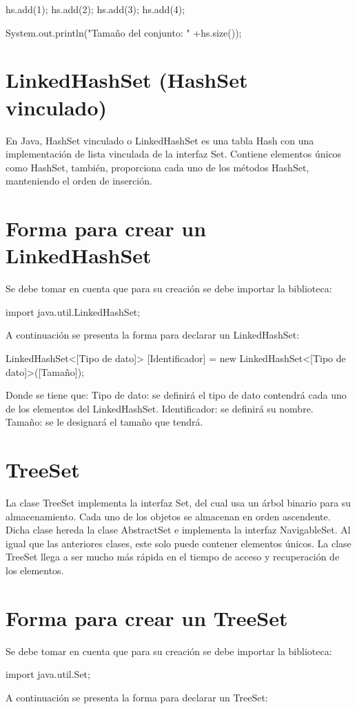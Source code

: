 \documentclass[12pt, letterpaper]{article} %
\begin{document}
hs.add(1);
hs.add(2);
hs.add(3);
hs.add(4);

System.out.println("Tamaño del conjunto: " +hs.size());


\section*{LinkedHashSet (HashSet vinculado)}
En Java, HashSet vinculado o LinkedHashSet es una tabla Hash con una implementación de lista vinculada de la interfaz Set. Contiene elementos únicos como HashSet, también, proporciona cada uno de los métodos HashSet, manteniendo el orden de inserción.

\section*{Forma para crear un LinkedHashSet}
Se debe tomar en cuenta que para su creación se debe importar la biblioteca:

import java.util.LinkedHashSet;

A continuación se presenta la forma para declarar un LinkedHashSet:

LinkedHashSet<[Tipo de dato]> [Identificador] = new LinkedHashSet<[Tipo de dato]>([Tamaño]);

Donde se tiene que:
Tipo de dato: se definirá el tipo de dato contendrá cada uno de los elementos del LinkedHashSet.
Identificador: se definirá su nombre.
Tamaño: se le designará el tamaño que tendrá.


\section*{TreeSet}
La clase TreeSet implementa la interfaz Set, del cual usa un árbol binario para su almacenamiento. Cada uno de los objetos se almacenan en orden ascendente. Dicha clase hereda la clase AbstractSet e implementa la interfaz NavigableSet. Al igual que las anteriores clases, este solo puede contener elementos únicos. La clase TreeSet llega a ser mucho más rápida en el tiempo de acceso y recuperación de los elementos.

\section*{Forma para crear un TreeSet}
Se debe tomar en cuenta que para su creación se debe importar la biblioteca:

import java.util.Set;

A continuación se presenta la forma para declarar un TreeSet:
\end{document}
